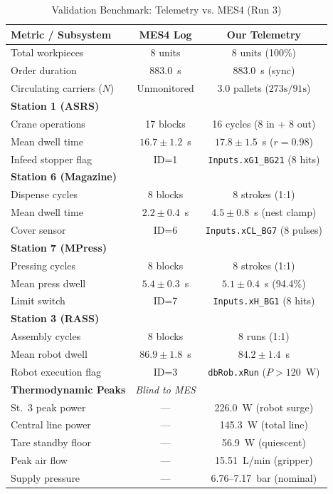 \documentclass[journal]{IEEEtran}
\begin{document}
\begin{table}[!t]
\caption{Validation Benchmark: Telemetry vs. MES4 (Run 3)\label{tab:mes_comparison}}
\centering
\footnotesize
\begin{tabular}{@{}lcc@{}}
\toprule
\textbf{Metric / Subsystem} & \textbf{MES4 Log} & \textbf{Our Telemetry} \\
\midrule
Total workpieces & 8 units & 8 units (100\%) \\
Order duration & 883.0~s & 883.0~s (sync) \\
Circulating carriers ($N$) & Unmonitored & 3.0 pallets ($273\text{s}/91\text{s}$) \\
\midrule
\textbf{Station 1 (ASRS)} & & \\
\quad Crane operations & 17 blocks & 16 cycles (8 in + 8 out) \\
\quad Mean dwell time & $16.7 \pm 1.2$~s & $17.8 \pm 1.5$~s ($r=0.98$) \\
\quad Infeed stopper flag & ID=1 & \texttt{Inputs.xG1\_BG21} (8 hits) \\
\midrule
\textbf{Station 6 (Magazine)} & & \\
\quad Dispense cycles & 8 blocks & 8 strokes (1:1) \\
\quad Mean dwell time & $2.2 \pm 0.4$~s & $4.5 \pm 0.8$~s (nest clamp) \\
\quad Cover sensor & ID=6 & \texttt{Inputs.xCL\_BG7} (8 pulses) \\
\midrule
\textbf{Station 7 (MPress)} & & \\
\quad Pressing cycles & 8 blocks & 8 strokes (1:1) \\
\quad Mean press dwell & $5.4 \pm 0.3$~s & $5.1 \pm 0.4$~s (94.4\%) \\
\quad Limit switch & ID=7 & \texttt{Inputs.xH\_BG1} (8 hits) \\
\midrule
\textbf{Station 3 (RASS)} & & \\
\quad Assembly cycles & 8 blocks & 8 runs (1:1) \\
\quad Mean robot dwell & $86.9 \pm 1.8$~s & $84.2 \pm 1.4$~s \\
\quad Robot execution flag & ID=3 & \texttt{dbRob.xRun} ($P > 120$~W) \\
\midrule
\textbf{Thermodynamic Peaks} & \textit{Blind to MES} & \\
\quad St.~3 peak power & --- & 226.0~W (robot surge) \\
\quad Central line power & --- & 145.3~W (total line) \\
\quad Tare standby floor & --- & 56.9~W (quiescent) \\
\quad Peak air flow & --- & 15.51~L/min (gripper) \\
\quad Supply pressure & --- & 6.76--7.17~bar (nominal) \\
\bottomrule
\end{tabular}
\end{table}
\end{document}
